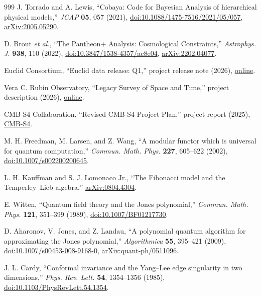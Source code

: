 \documentclass[aps,prd,reprint,nofootinbib,superscriptaddress,floatfix]{revtex4-2}
\numberwithin{equation}{section}
\theoremstyle{definition}
\theoremstyle{plain}
\begin{document}
\begin{thebibliography}{999}
J. Torrado and A. Lewis,
``Cobaya: Code for Bayesian Analysis of hierarchical physical models,''
\emph{JCAP} \textbf{05}, 057 (2021),
\href{https://doi.org/10.1088/1475-7516/2021/05/057}{doi:10.1088/1475-7516/2021/05/057},
\href{https://arxiv.org/abs/2005.05290}{arXiv:2005.05290}.

D. Brout \emph{et al.},
``The Pantheon+ Analysis: Cosmological Constraints,''
\emph{Astrophys. J.} \textbf{938}, 110 (2022),
\href{https://doi.org/10.3847/1538-4357/ac8e04}{doi:10.3847/1538-4357/ac8e04},
\href{https://arxiv.org/abs/2202.04077}{arXiv:2202.04077}.

Euclid Consortium,
``Euclid data release: Q1,''
project release note (2026),
\href{https://www.euclid-ec.org/science/q1/}{online}.

Vera C. Rubin Observatory,
``Legacy Survey of Space and Time,''
project description (2026),
\href{https://rubinobservatory.org/explore/how-rubin-works/lsst}{online}.

CMB-S4 Collaboration,
``Revised CMB-S4 Project Plan,''
project report (2025),
\href{https://cmb-s4.org/}{CMB-S4}.




M. H. Freedman, M. Larsen, and Z. Wang,
``A modular functor which is universal for quantum computation,''
\emph{Commun. Math. Phys.} \textbf{227}, 605--622 (2002),
\href{https://doi.org/10.1007/s002200200645}{doi:10.1007/s002200200645}.

L. H. Kauffman and S. J. Lomonaco Jr.,
``The Fibonacci model and the Temperley--Lieb algebra,''
\href{https://arxiv.org/abs/0804.4304}{arXiv:0804.4304}.

E. Witten,
``Quantum field theory and the Jones polynomial,''
\emph{Commun. Math. Phys.} \textbf{121}, 351--399 (1989),
\href{https://doi.org/10.1007/BF01217730}{doi:10.1007/BF01217730}.

D. Aharonov, V. Jones, and Z. Landau,
``A polynomial quantum algorithm for approximating the Jones polynomial,''
\emph{Algorithmica} \textbf{55}, 395--421 (2009),
\href{https://doi.org/10.1007/s00453-008-9168-0}{doi:10.1007/s00453-008-9168-0},
\href{https://arxiv.org/abs/quant-ph/0511096}{arXiv:quant-ph/0511096}.

J. L. Cardy,
``Conformal invariance and the Yang--Lee edge singularity in two dimensions,''
\emph{Phys. Rev. Lett.} \textbf{54}, 1354--1356 (1985),
\href{https://doi.org/10.1103/PhysRevLett.54.1354}{doi:10.1103/PhysRevLett.54.1354}.

\end{thebibliography}
\end{document}
